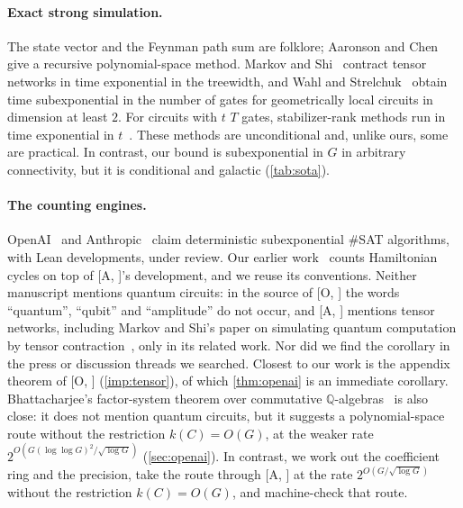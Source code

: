 \documentclass[10pt]{amsart}
\theoremstyle{plain}
\theoremstyle{definition}
\theoremstyle{remark}
\numberwithin{equation}{section}
\newcommand{\A}[1][]{\textup{[A\if\relax\detokenize{#1}\relax\else, #1\fi]}}
\newcommand{\Oa}[1][]{\textup{[O\if\relax\detokenize{#1}\relax\else, #1\fi]}}
\begin{document}
\paragraph{Exact strong simulation.} The state vector and the Feynman path sum are folklore; Aaronson
and Chen~\cite[Thm.~4.1]{AC17} give a recursive polynomial-space method. Markov and
Shi~\cite{MarkovShi08} contract tensor networks in time exponential in the treewidth, and Wahl and
Strelchuk~\cite{WahlStrelchuk} obtain time subexponential in the number of gates for geometrically
local circuits in dimension at least $2$. For circuits with $t$ $T$ gates, stabilizer-rank methods run
in time exponential in $t$~\cite{BSS16,BravyiGosset16,QPG21}. These methods are unconditional and,
unlike ours, some are practical. In contrast, our bound is subexponential in $G$ in arbitrary
connectivity, but it is conditional and galactic (\cref{tab:sota}).

\paragraph{The counting engines.} OpenAI~\cite{OpenAI26} and Anthropic~\cite{Anthropic26} claim deterministic
subexponential $\#$SAT algorithms, with Lean developments, under review. Our earlier
work~\cite{Tulsyan26} counts Hamiltonian cycles on top of \A's development, and we reuse its
conventions. Neither manuscript mentions quantum circuits: in the source of \Oa{} the words
``quantum'', ``qubit'' and ``amplitude'' do not occur, and \A{} mentions tensor networks, including
Markov and Shi's paper on simulating quantum computation by tensor contraction~\cite{MarkovShi08},
only in its related work. Nor did we find the corollary in the press or discussion threads we
searched. Closest to our work is the appendix theorem of \Oa{} (\cref{imp:tensor}), of which
\cref{thm:openai} is an immediate corollary. Bhattacharjee's factor-system theorem over commutative
$\mathbb{Q}$-algebras~\cite[Thm.~5.3]{Bhattacharjee26} is also close: it does not mention quantum circuits,
but it suggests a polynomial-space route without the restriction $k(C)=O(G)$, at the weaker rate
$2^{O(G(\log\log G)^2/\sqrt{\log G})}$ (\cref{sec:openai}). In contrast, we work out the coefficient ring and the
precision, take the route through \A{} at the rate $2^{O(G/\sqrt{\log G})}$ without the restriction
$k(C)=O(G)$, and machine-check that route.
\end{document}
